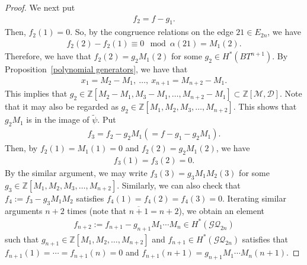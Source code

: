 \documentclass[12pt]{amsart}
\theoremstyle{remark}
\numberwithin{equation}{section}
\begin{document}
\begin{proof}
We next put 
\begin{align*}
f_{2}=f-g_{1}. %
\end{align*} 
Then, $f_{2}(1)=0$.
So, 
by the congruence relations on the edge $21\in E_{2n}$, 
we have 
\begin{align*}
f_{2}(2)-f_{2}(1)\equiv 0 \mod \alpha(21)=M_{1}(2).
\end{align*}
Therefore, we have that 
$f_{2}(2)=g_{2}M_{1}(2)$ for some $g_{2}\in H^{*}(BT^{n+1})$.
By Proposition~\ref{polynomial generators}, 
we have that 
\begin{align*}
x_{1}=M_{2}-M_{1},\ \ldots,\ x_{n+1}=M_{n+2}-M_{1}.
\end{align*}
This implies that 
$g_{2}\in \mathbb{Z}[M_{2}-M_{1},M_{3}-M_{1},\ldots, M_{n+2}-M_{1}]\subset \mathbb{Z}[\mathcal{M},\mathcal{D}]$.
Note that it may also be regarded as $g_{2}\in \mathbb{Z}[M_{1},M_{2},M_{3},\ldots, M_{n+2}]$.
This shows that $g_{2}M_{1}$ is in the image of $\widetilde{\psi}$.
Put 
\begin{align*}
f_{3}=f_{2}-g_{2}M_{1} (=f-g_{1}-g_{2}M_{1}).
\end{align*}
Then, by $f_{2}(1)=M_{1}(1)=0$ and $f_{2}(2)=g_{2}M_{1}(2)$, we have 
\begin{align*}
f_{3}(1)=f_{3}(2)=0.
\end{align*}
By the similar argument, we may write $f_{3}(3)=g_{3}M_{1}M_{2}(3)$ 
for some $g_{3}\in \mathbb{Z}[M_{1},M_{2},M_{3},\ldots, M_{n+2}]$.
Similarly, we can also check that 
$f_{4}:=f_{3}-g_{3}M_{1}M_{2}$ satisfies $f_{4}(1)=f_{4}(2)=f_{4}(3)=0$.
Iterating similar arguments $n+2$ times (note that $\overline{n+1}=n+2$), 
we obtain an element 
\begin{align*}
f_{n+2}:=f_{n+1}-g_{n+1}M_{1}\cdots M_{n}\in H^{*}(\mathcal{GQ}_{2n})
\end{align*}
such that $g_{n+1}\in \mathbb{Z}[M_{1},M_{2},\ldots, M_{n+2}]$ and 
 $f_{n+1}\in H^{*}(\mathcal{GQ}_{2n})$ satisfies that 
$f_{n+1}(1)=\cdots =f_{n+1}(n)=0$ and $f_{n+1}(n+1)=g_{n+1}M_{1}\cdots M_{n}(n+1)$.

\end{proof}
\end{document}
